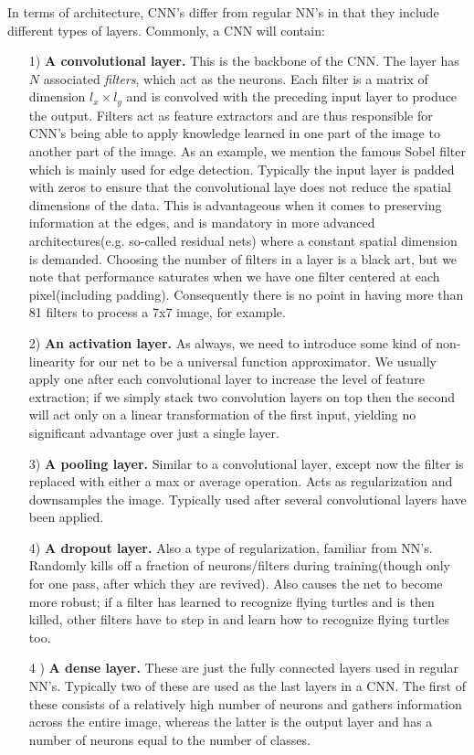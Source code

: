 \documentclass[]{article}
\begin{document}
In terms of architecture, CNN's differ from regular NN's in that they include different types of layers. Commonly, a CNN will contain:
\begin{itemize}
	\item[1)] \textbf{A convolutional layer.} This is the backbone of the CNN. The layer has $N$ associated \textit{filters}, which act as the neurons. Each filter is a matrix of dimension $l_x\times l_y$ and is convolved with the preceding input layer to produce the output. Filters act as feature extractors and are thus responsible for CNN's being able to apply knowledge learned in one part of the image to another part of the image. As an example, we mention the famous Sobel filter which is mainly used for edge detection.  Typically the input layer is padded with zeros to ensure that the convolutional laye does not reduce the spatial dimensions of the data. This is advantageous when it comes to preserving information at the edges, and is mandatory in more advanced architectures(e.g. so-called residual nets) where a constant spatial dimension is demanded. Choosing the number of filters in a layer is a black art, but we note that performance saturates when we have one filter centered at each pixel(including padding). Consequently there is no point in having more than 81 filters to process a 7x7 image, for example.
	\item[2)] \textbf{An activation layer.} As always, we need to introduce some kind of non-linearity for our net to be a universal function approximator. We usually apply one after each convolutional layer to increase the level of feature extraction; if we simply stack two convolution layers on top then the second will act only on a linear transformation of the first input, yielding no significant advantage over just a single layer. 
	\item[3)] \textbf{A pooling layer.} Similar to a convolutional layer, except now the filter is replaced with either a max or average operation. Acts as regularization and downsamples the image. Typically used after several convolutional layers have been applied. 
	\item[4)] \textbf{A dropout layer.} Also a type of regularization, familiar from NN's. Randomly kills off a fraction of neurons/filters during training(though only for one pass, after which they are revived). Also causes the net to become more robust; if a filter has learned to recognize flying turtles and is then killed, other filters have to step in and learn how to recognize flying turtles too.
	\item[4]) \textbf{A dense layer.} These are just the fully connected layers used in regular NN's. Typically two of these are used as the last layers in a CNN. The first of these consists of a relatively high number of neurons and gathers information across the entire image, whereas the latter is the output layer and has a number of neurons equal to the number of classes.
\end{itemize}
\end{document}
